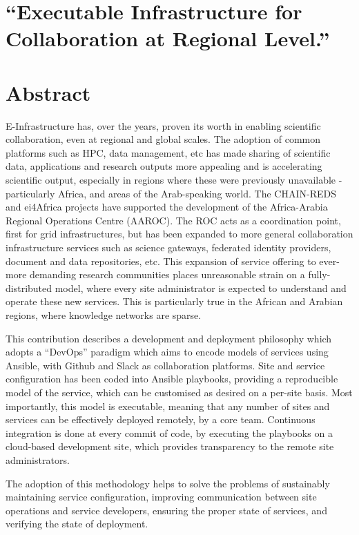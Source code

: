 \section{``Executable Infrastructure for Collaboration at Regional
Level.''}\label{executable-infrastructure-for-collaboration-at-regional-level.}

\section{Abstract}\label{abstract}

E-Infrastructure has, over the years, proven its worth in enabling
scientific collaboration, even at regional and global scales. The
adoption of common platforms such as HPC, data management, etc has made
sharing of scientific data, applications and research outputs more
appealing and is accelerating scientific output, especially in regions
where these were previously unavailable - particularly Africa, and areas
of the Arab-speaking world. The CHAIN-REDS and ei4Africa projects have
supported the development of the Africa-Arabia Regional Operations
Centre (AAROC). The ROC acts as a coordination point, first for grid
infrastructures, but has been expanded to more general collaboration
infrastructure services such as science gateways, federated identity
providers, document and data repositories, etc. This expansion of
service offering to ever-more demanding research communities places
unreasonable strain on a fully-distributed model, where every site
administrator is expected to understand and operate these new services.
This is particularly true in the African and Arabian regions, where
knowledge networks are sparse.

This contribution describes a development and deployment philosophy
which adopts a ``DevOps'' paradigm which aims to encode models of
services using Ansible, with Github and Slack as collaboration
platforms. Site and service configuration has been coded into Ansible
playbooks, providing a reproducible model of the service, which can be
customised as desired on a per-site basis. Most importantly, this model
is executable, meaning that any number of sites and services can be
effectively deployed remotely, by a core team. Continuous integration is
done at every commit of code, by executing the playbooks on a
cloud-based development site, which provides transparency to the remote
site administrators.

The adoption of this methodology helps to solve the problems of
sustainably maintaining service configuration, improving communication
between site operations and service developers, ensuring the proper
state of services, and verifying the state of deployment.

